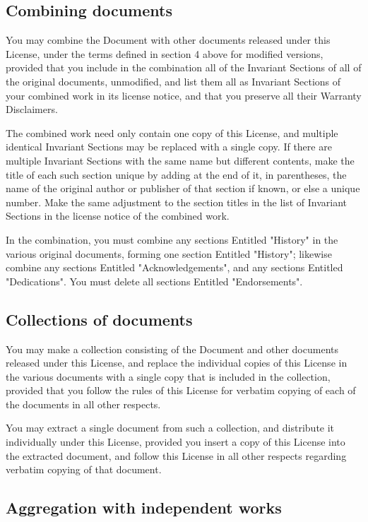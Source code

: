 \documentclass[11pt]{article}
\begin{document}
\subsection*{Combining documents}

You may combine the Document with other documents released under this
License, under the terms defined in section 4 above for modified
versions, provided that you include in the combination all of the
Invariant Sections of all of the original documents, unmodified, and
list them all as Invariant Sections of your combined work in its
license notice, and that you preserve all their Warranty Disclaimers.

The combined work need only contain one copy of this License, and
multiple identical Invariant Sections may be replaced with a single
copy.  If there are multiple Invariant Sections with the same name but
different contents, make the title of each such section unique by
adding at the end of it, in parentheses, the name of the original
author or publisher of that section if known, or else a unique number.
Make the same adjustment to the section titles in the list of
Invariant Sections in the license notice of the combined work.

In the combination, you must combine any sections Entitled "History"
in the various original documents, forming one section Entitled
"History"; likewise combine any sections Entitled "Acknowledgements",
and any sections Entitled "Dedications".  You must delete all sections
Entitled "Endorsements".


\subsection*{Collections of documents}

You may make a collection consisting of the Document and other documents
released under this License, and replace the individual copies of this
License in the various documents with a single copy that is included in
the collection, provided that you follow the rules of this License for
verbatim copying of each of the documents in all other respects.

You may extract a single document from such a collection, and distribute
it individually under this License, provided you insert a copy of this
License into the extracted document, and follow this License in all
other respects regarding verbatim copying of that document.


\subsection*{Aggregation with independent works}
\end{document}
